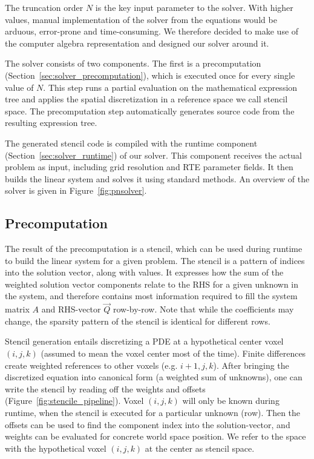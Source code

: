 \documentclass{egpubl}
\newcommand{\nocontentsline}[3]{}
\newcommand{\tocless}[2]{\bgroup\let\addcontentsline=\nocontentsline#1{#2}\egroup}
\begin{document}
The truncation order $N$ is the key input parameter to the solver. With higher values, manual implementation of the solver from the equations would be arduous, error-prone and time-consuming. We therefore decided to make use of the computer algebra representation and designed our solver around it.

The solver consists of two components. The first is a precomputation (Section~\ref{sec:solver_precomputation}), which is executed once for every single value of $N$. This step runs a partial evaluation on the mathematical expression tree and applies the spatial discretization in a reference space we call stencil space. The precomputation step automatically generates source code from the resulting expression tree.

The generated stencil code is compiled with the runtime component (Section~\ref{sec:solver_runtime}) of our solver. This component receives the actual problem as input, including grid resolution and RTE parameter fields. It then builds the linear system and solves it using standard methods. An overview of the solver is given in Figure~\ref{fig:pnsolver}.



\tocless\subsection{Precomputation \label{sec:solver_precomputation}}

The result of the precomputation is a stencil, which can be used during runtime to build the linear system for a given problem. The stencil is a pattern of indices into the solution vector, along with values. It expresses how the sum of the weighted solution vector components relate to the RHS for a given unknown in the system, and therefore contains most information required to fill the system matrix $A$ and RHS-vector $\vec{Q}$ row-by-row. Note that while the coefficients may change, the sparsity pattern of the stencil is identical for different rows.

\vspace{0.8in}

Stencil generation entails discretizing a PDE at a hypothetical center voxel $(i, j, k)$ (assumed to mean the voxel center most of the time). Finite differences create weighted references to other voxels (e.g. $i+1, j, k$). After bringing the discretized equation into canonical form (a weighted sum of unknowns), one can write the stencil by reading off the weights and offsets (Figure~\ref{fig:stencile_pipeline}). Voxel $(i, j, k)$ will only be known during runtime, when the stencil is executed for a particular unknown (row). Then the offsets can be used to find the component index into the solution-vector, and weights can be evaluated for concrete world space position. We refer to the space with the hypothetical voxel $(i, j, k)$ at the center as stencil space.
\end{document}

